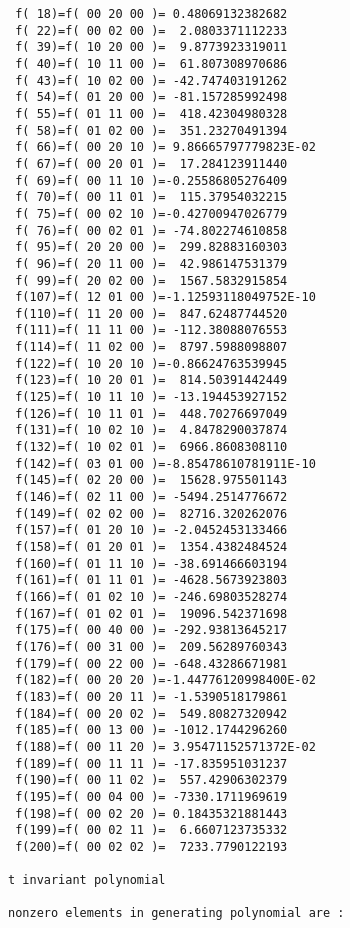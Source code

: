 \begin{footnotesize}
\begin{verbatim}
 f( 18)=f( 00 20 00 )= 0.48069132382682
 f( 22)=f( 00 02 00 )=  2.0803371112233
 f( 39)=f( 10 20 00 )=  9.8773923319011
 f( 40)=f( 10 11 00 )=  61.807308970686
 f( 43)=f( 10 02 00 )= -42.747403191262
 f( 54)=f( 01 20 00 )= -81.157285992498
 f( 55)=f( 01 11 00 )=  418.42304980328
 f( 58)=f( 01 02 00 )=  351.23270491394
 f( 66)=f( 00 20 10 )= 9.86665797779823E-02
 f( 67)=f( 00 20 01 )=  17.284123911440
 f( 69)=f( 00 11 10 )=-0.25586805276409
 f( 70)=f( 00 11 01 )=  115.37954032215
 f( 75)=f( 00 02 10 )=-0.42700947026779
 f( 76)=f( 00 02 01 )= -74.802274610858
 f( 95)=f( 20 20 00 )=  299.82883160303
 f( 96)=f( 20 11 00 )=  42.986147531379
 f( 99)=f( 20 02 00 )=  1567.5832915854
 f(107)=f( 12 01 00 )=-1.12593118049752E-10
 f(110)=f( 11 20 00 )=  847.62487744520
 f(111)=f( 11 11 00 )= -112.38088076553
 f(114)=f( 11 02 00 )=  8797.5988098807
 f(122)=f( 10 20 10 )=-0.86624763539945
 f(123)=f( 10 20 01 )=  814.50391442449
 f(125)=f( 10 11 10 )= -13.194453927152
 f(126)=f( 10 11 01 )=  448.70276697049
 f(131)=f( 10 02 10 )=  4.8478290037874
 f(132)=f( 10 02 01 )=  6966.8608308110
 f(142)=f( 03 01 00 )=-8.85478610781911E-10
 f(145)=f( 02 20 00 )=  15628.975501143
 f(146)=f( 02 11 00 )= -5494.2514776672
 f(149)=f( 02 02 00 )=  82716.320262076
 f(157)=f( 01 20 10 )= -2.0452453133466
 f(158)=f( 01 20 01 )=  1354.4382484524
 f(160)=f( 01 11 10 )= -38.691466603194
 f(161)=f( 01 11 01 )= -4628.5673923803
 f(166)=f( 01 02 10 )= -246.69803528274
 f(167)=f( 01 02 01 )=  19096.542371698
 f(175)=f( 00 40 00 )= -292.93813645217
 f(176)=f( 00 31 00 )=  209.56289760343
 f(179)=f( 00 22 00 )= -648.43286671981
 f(182)=f( 00 20 20 )=-1.44776120998400E-02
 f(183)=f( 00 20 11 )= -1.5390518179861
 f(184)=f( 00 20 02 )=  549.80827320942
 f(185)=f( 00 13 00 )= -1012.1744296260
 f(188)=f( 00 11 20 )= 3.95471152571372E-02
 f(189)=f( 00 11 11 )= -17.835951031237
 f(190)=f( 00 11 02 )=  557.42906302379
 f(195)=f( 00 04 00 )= -7330.1711969619
 f(198)=f( 00 02 20 )= 0.18435321881443
 f(199)=f( 00 02 11 )=  6.6607123735332
 f(200)=f( 00 02 02 )=  7233.7790122193

t invariant polynomial

nonzero elements in generating polynomial are :


\end{verbatim}
\end{footnotesize}
